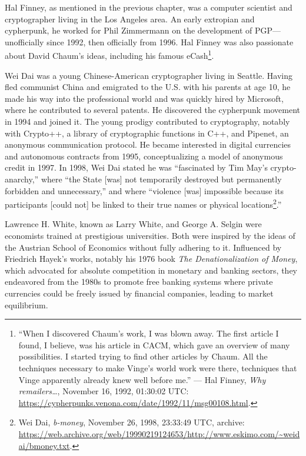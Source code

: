 \documentclass[
  a5paper,
  smalldemyvopaper,10pt,twoside,onecolumn,openright,extrafontsizes,hidelinks]{memoir}
\begin{document}
Hal Finney, as mentioned in the previous chapter, was a computer
scientist and cryptographer living in the Los Angeles area. An early
extropian and cypherpunk, he worked for Phil Zimmermann on the
development of PGP---unofficially since 1992, then officially from 1996.
Hal Finney was also passionate about David Chaum's ideas, including his
famous eCash\footnote{``When I discovered Chaum's work, I was blown
  away. The first article I found, I believe, was his article in CACM,
  which gave an overview of many possibilities. I started trying to find
  other articles by Chaum. All the techniques necessary to make Vinge's
  world work were there, techniques that Vinge apparently already knew
  well before me.'' --- Hal Finney, \emph{Why remailers\ldots{}},
  November 16, 1992, 01:30:02 UTC:
  \url{https://cypherpunks.venona.com/date/1992/11/msg00108.html}.}.

Wei Dai was a young Chinese-American cryptographer living in Seattle.
Having fled communist China and emigrated to the U.S. with his parents
at age 10, he made his way into the professional world and was quickly
hired by Microsoft, where he contributed to several patents. He
discovered the cypherpunk movement in 1994 and joined it. The young
prodigy contributed to cryptography, notably with Crypto++, a library of
cryptographic functions in C++, and Pipenet, an anonymous communication
protocol. He became interested in digital currencies and autonomous
contracts from 1995, conceptualizing a model of anonymous credit in
1997. In 1998, Wei Dai stated he was ``fascinated by Tim May's
crypto-anarchy,'' where ``the State {[}was{]} not temporarily destroyed
but permanently forbidden and unnecessary,'' and where ``violence
{[}was{]} impossible because its participants {[}could not{]} be linked
to their true names or physical locations\footnote{Wei Dai,
  \emph{b-money}, November 26, 1998, 23:33:49 UTC, archive:
  \url{https://web.archive.org/web/19990219124653/http://www.eskimo.com/~weidai/bmoney.txt}.}.''

Lawrence H. White, known as Larry White, and George A. Selgin were
economists trained at prestigious universities. Both were inspired by
the ideas of the Austrian School of Economics without fully adhering to
it. Influenced by Friedrich Hayek's works, notably his 1976 book
\emph{The Denationalization of Money}, which advocated for absolute
competition in monetary and banking sectors, they endeavored from the
1980s to promote free banking systems where private currencies could be
freely issued by financial companies, leading to market equilibrium.
\end{document}
